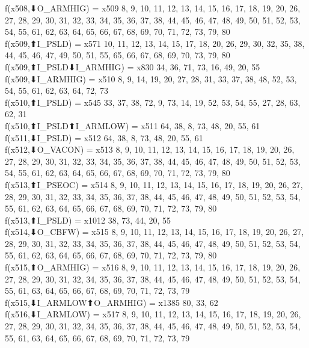 f(x508,⬇O_ARMHIG) = x509 {8, 9, 10, 11, 12, 13, 14, 15, 16, 17, 18, 19, 20, 26, 27, 28, 29, 30, 31, 32, 33, 34, 35, 36, 37, 38, 44, 45, 46, 47, 48, 49, 50, 51, 52, 53, 54, 55, 61, 62, 63, 64, 65, 66, 67, 68, 69, 70, 71, 72, 73, 79, 80} \\
f(x509,⬆I_PSLD) = x571 {10, 11, 12, 13, 14, 15, 17, 18, 20, 26, 29, 30, 32, 35, 38, 44, 45, 46, 47, 49, 50, 51, 55, 65, 66, 67, 68, 69, 70, 73, 79, 80} \\
f(x509,⬆I_PSLD⬇I_ARMHIG) = x830 {34, 36, 71, 73, 16, 49, 20, 55} \\
f(x509,⬇I_ARMHIG) = x510 {8, 9, 14, 19, 20, 27, 28, 31, 33, 37, 38, 48, 52, 53, 54, 55, 61, 62, 63, 64, 72, 73} \\
f(x510,⬆I_PSLD) = x545 {33, 37, 38, 72, 9, 73, 14, 19, 52, 53, 54, 55, 27, 28, 63, 62, 31} \\
f(x510,⬆I_PSLD⬆I_ARMLOW) = x511 {64, 38, 8, 73, 48, 20, 55, 61} \\
f(x511,⬇I_PSLD) = x512 {64, 38, 8, 73, 48, 20, 55, 61} \\
f(x512,⬇O_VACON) = x513 {8, 9, 10, 11, 12, 13, 14, 15, 16, 17, 18, 19, 20, 26, 27, 28, 29, 30, 31, 32, 33, 34, 35, 36, 37, 38, 44, 45, 46, 47, 48, 49, 50, 51, 52, 53, 54, 55, 61, 62, 63, 64, 65, 66, 67, 68, 69, 70, 71, 72, 73, 79, 80} \\
f(x513,⬆I_PSEOC) = x514 {8, 9, 10, 11, 12, 13, 14, 15, 16, 17, 18, 19, 20, 26, 27, 28, 29, 30, 31, 32, 33, 34, 35, 36, 37, 38, 44, 45, 46, 47, 48, 49, 50, 51, 52, 53, 54, 55, 61, 62, 63, 64, 65, 66, 67, 68, 69, 70, 71, 72, 73, 79, 80} \\
f(x513,⬆I_PSLD) = x1012 {38, 73, 44, 20, 55} \\
f(x514,⬇O_CBFW) = x515 {8, 9, 10, 11, 12, 13, 14, 15, 16, 17, 18, 19, 20, 26, 27, 28, 29, 30, 31, 32, 33, 34, 35, 36, 37, 38, 44, 45, 46, 47, 48, 49, 50, 51, 52, 53, 54, 55, 61, 62, 63, 64, 65, 66, 67, 68, 69, 70, 71, 72, 73, 79, 80} \\
f(x515,⬆O_ARMHIG) = x516 {8, 9, 10, 11, 12, 13, 14, 15, 16, 17, 18, 19, 20, 26, 27, 28, 29, 30, 31, 32, 34, 35, 36, 37, 38, 44, 45, 46, 47, 48, 49, 50, 51, 52, 53, 54, 55, 61, 63, 64, 65, 66, 67, 68, 69, 70, 71, 72, 73, 79} \\
f(x515,⬇I_ARMLOW⬆O_ARMHIG) = x1385 {80, 33, 62} \\
f(x516,⬇I_ARMLOW) = x517 {8, 9, 10, 11, 12, 13, 14, 15, 16, 17, 18, 19, 20, 26, 27, 28, 29, 30, 31, 32, 34, 35, 36, 37, 38, 44, 45, 46, 47, 48, 49, 50, 51, 52, 53, 54, 55, 61, 63, 64, 65, 66, 67, 68, 69, 70, 71, 72, 73, 79} \\
